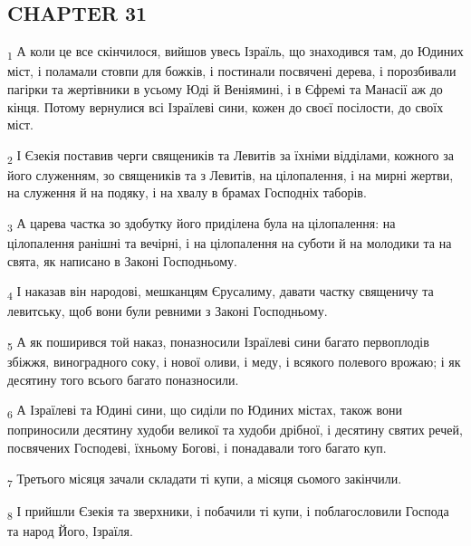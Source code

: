 \subsection{CHAPTER 31}
\begin{tcolorbox}
\textsubscript{1} А коли це все скінчилося, вийшов увесь Ізраїль, що знаходився там, до Юдиних міст, і поламали стовпи для божків, і постинали посвячені дерева, і порозбивали пагірки та жертівники в усьому Юді й Веніямині, і в Єфремі та Манасії аж до кінця. Потому вернулися всі Ізраїлеві сини, кожен до своєї посілости, до своїх міст.
\end{tcolorbox}
\begin{tcolorbox}
\textsubscript{2} І Єзекія поставив черги священиків та Левитів за їхніми відділами, кожного за його служенням, зо священиків та з Левитів, на цілопалення, і на мирні жертви, на служення й на подяку, і на хвалу в брамах Господніх таборів.
\end{tcolorbox}
\begin{tcolorbox}
\textsubscript{3} А царева частка зо здобутку його приділена була на цілопалення: на цілопалення ранішні та вечірні, і на цілопалення на суботи й на молодики та на свята, як написано в Законі Господньому.
\end{tcolorbox}
\begin{tcolorbox}
\textsubscript{4} І наказав він народові, мешканцям Єрусалиму, давати частку священичу та левитську, щоб вони були ревними з Законі Господньому.
\end{tcolorbox}
\begin{tcolorbox}
\textsubscript{5} А як поширився той наказ, поназносили Ізраїлеві сини багато первоплодів збіжжя, виноградного соку, і нової оливи, і меду, і всякого полевого врожаю; і як десятину того всього багато поназносили.
\end{tcolorbox}
\begin{tcolorbox}
\textsubscript{6} А Ізраїлеві та Юдині сини, що сиділи по Юдиних містах, також вони поприносили десятину худоби великої та худоби дрібної, і десятину святих речей, посвячених Господеві, їхньому Богові, і понадавали того багато куп.
\end{tcolorbox}
\begin{tcolorbox}
\textsubscript{7} Третього місяця зачали складати ті купи, а місяця сьомого закінчили.
\end{tcolorbox}
\begin{tcolorbox}
\textsubscript{8} І прийшли Єзекія та зверхники, і побачили ті купи, і поблагословили Господа та народ Його, Ізраїля.
\end{tcolorbox}
